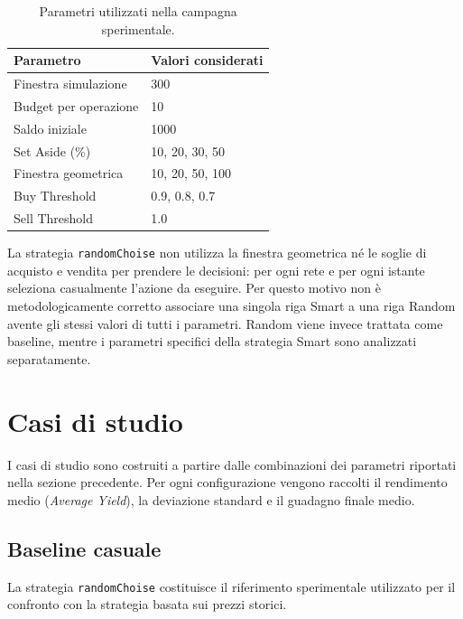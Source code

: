 \documentclass[12pt,a4paper,oneside]{report}
\begin{document}
\begin{table}[H]
    \centering
    \caption{Parametri utilizzati nella campagna sperimentale.}
    \label{tab:experimental-parameters}
    \begin{tabular}{ll}
        \toprule
        Parametro & Valori considerati \\
        \midrule
        Finestra simulazione & 300 \\
        Budget per operazione & 10 \\
        Saldo iniziale & 1000 \\
        Set Aside (\%) & 10, 20, 30, 50 \\
        Finestra geometrica & 10, 20, 50, 100 \\
        Buy Threshold & 0.9, 0.8, 0.7 \\
        Sell Threshold & 1.0 \\
        \bottomrule
    \end{tabular}
\end{table}

La strategia \texttt{randomChoise} non utilizza la finestra geometrica né le
soglie di acquisto e vendita per prendere le decisioni: per ogni rete e per
ogni istante seleziona casualmente l'azione da eseguire. Per questo motivo non
è metodologicamente corretto associare una singola riga Smart a una riga
Random avente gli stessi valori di tutti i parametri. Random viene invece
trattata come baseline, mentre i parametri specifici della strategia Smart
sono analizzati separatamente.



\section{Casi di studio}

I casi di studio sono costruiti a partire dalle combinazioni dei parametri
riportati nella sezione precedente. Per ogni configurazione vengono raccolti
il rendimento medio (\textit{Average Yield}), la deviazione standard e il
guadagno finale medio.

\subsection{Baseline casuale}

La strategia \texttt{randomChoise} costituisce il riferimento sperimentale
utilizzato per il confronto con la strategia basata sui prezzi storici.
\end{document}
